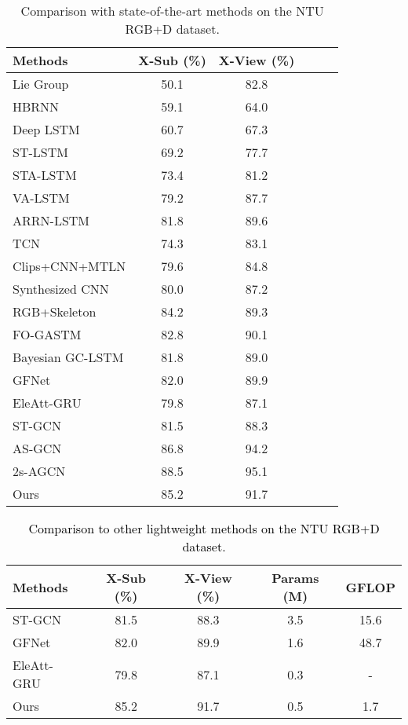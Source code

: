 \documentclass[letterpaper, 10 pt, conference]{ieeeconf}
\newcommand{\todo}[1]{{\textcolor{black}{#1}}}
\begin{document}
\begin{table}[tb]
\centering
\resizebox{\linewidth}{!}
{\begin{tabular}{lccccc}
\hline
Methods     &  X-Sub (\%) & X-View (\%) \\
\hline
Lie Group\cite{vemulapalli2014human} & 50.1 & 82.8 \\
HBRNN\cite{du2015hierarchical} & 59.1 & 64.0 \\
Deep LSTM\cite{shahroudy2016ntu} & 60.7 & 67.3 \\
ST-LSTM\cite{liu2016spatio} & 69.2 & 77.7 \\
STA-LSTM\cite{song2017end} & 73.4 & 81.2 \\
VA-LSTM\cite{zhang2017view} & 79.2 & 87.7 \\
ARRN-LSTM\cite{zheng2018skeleton} & 81.8 & 89.6 \\
TCN\cite{kim2017interpretable} & 74.3 & 83.1 \\
Clips+CNN+MTLN\cite{ke2017new} & 79.6 & 84.8 \\
Synthesized CNN\cite{liu2017enhanced} & 80.0 & 87.2 \\
RGB+Skeleton\cite{fan2020context} & 84.2 & 89.3 \\
FO-GASTM\cite{li2019learning} & 82.8 & 90.1 \\
Bayesian GC-LSTM\cite{zhao2019bayesian} & 81.8 & 89.0 \\
GFNet \cite{liu2020gfnet} & 82.0 & 89.9 \\
EleAtt-GRU\cite{zhang2019eleatt} & 79.8 & 87.1 \\
ST-GCN\cite{yan2018spatial} & 81.5 & 88.3 \\
AS-GCN\cite{li2019actional} & 86.8 & 94.2 \\
2s-AGCN\cite{shi2019two} & 88.5 & 95.1\\
\hline
Ours        &     85.2   &     91.7     \\
\hline
\end{tabular}}
\caption{Comparison with state-of-the-art methods on the NTU RGB+D dataset.}
\label{tab:stoa_n}
\end{table}

\begin{table}[tb]
\centering
\resizebox{\linewidth}{!}
{\begin{tabular}{lcccc} 
\hline
Methods     &  X-Sub (\%) & X-View (\%) & Params (M) & GFLOP \\
\hline
ST-GCN \cite{yan2018spatial} & 81.5 & 88.3 & 3.5 & 15.6\\
GFNet \cite{liu2020gfnet} & 82.0 & 89.9 & 1.6 & 48.7 \\
EleAtt-GRU \cite{zhang2019eleatt} & 79.8 & 87.1 & 0.3 & -\\
\hline
Ours & 85.2 & 91.7 & 0.5 & 1.7 \\
\hline
\end{tabular}}
\caption{\todo{Comparison to other lightweight methods on the NTU RGB+D dataset.}}
\label{tab:stoa_efficiency}
\vspace{-1cm}
\end{table}
\end{document}
